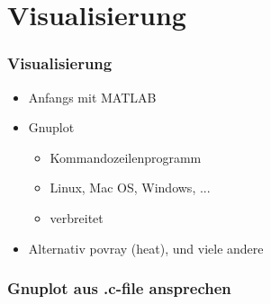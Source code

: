 \section{Visualisierung}

\begin{frame}
\frametitle{Visualisierung}
	\begin{itemize}[<+->]
	\item Anfangs mit MATLAB
	\item Gnuplot
		\begin{itemize}[<+->]
		\item Kommandozeilenprogramm
		\item Linux, Mac OS, Windows, ...
		\item verbreitet
		\end{itemize} 
	\item Alternativ povray (heat), und viele andere
	\end{itemize} 
\end{frame}

\begin{frame}
\frametitle{Gnuplot aus .c-file ansprechen}
	
\end{frame}
